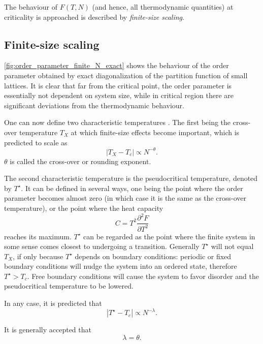 The behaviour of $F(T, N)$ (and hence, all thermodynamic quantities) at criticality is approached is described by
\emph{finite-size scaling}.

\subsection{Finite-size scaling}

\autoref{fig:order_parameter_finite_N_exact} shows the behaviour of the order parameter obtained by exact
diagonalization of the partition function of small lattices.
It is clear that far from the critical point, the order parameter is essentially not dependent on system size,
while in critical region there are significant deviations from the thermodynamic behaviour.

One can now define two characteristic temperatures \cite{fisher1967interfacial,
barber1983finite}.
The first being the cross-over temperature $T_X$ at which finite-size effects become important,
which is predicted to scale as
\begin{equation}
  |T_X - T_c| \propto N^{-\theta}.
\end{equation}
$\theta$ is called the cross-over or rounding exponent.

The second characteristic temperature is the pseudocritical temperature, denoted by $T^{\star}$.
It can be defined in several ways, one being the point where the order parameter becomes almost zero (in which case it is the same as the cross-over temperature), or the point where the heat capacity
\begin{equation}
  C = T^2 \frac{\partial^2 F}{\partial T^2}
\end{equation}
reaches its maximum.
$T^{\star}$ can be regarded as the point where the finite system in some sense comes closest to undergoing a transition.
Generally $T^{\star}$ will not equal $T_X$, if only because $T^{\star}$ depends on boundary conditions:
periodic or fixed boundary conditions will nudge the system into an ordered state,
therefore $T^{\star} > T_c$.
Free boundary conditions will cause the system to favor disorder and the pseudocritical temperature to be lowered.

In any case, it is predicted that
\begin{equation}
  |T^{\star} - T_c| \propto N^{-\lambda}.
\end{equation}

It is generally accepted that \cite{barber1983finite}
\begin{equation}
  \lambda = \theta.
\end{equation}

